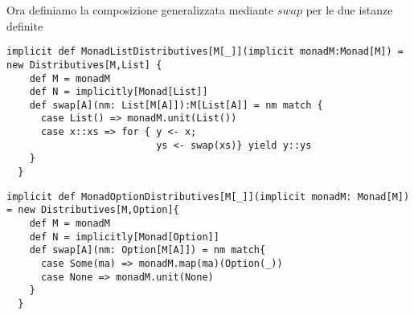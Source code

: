 Ora definiamo la composizione generalizzata mediante $swap$ per le due istanze
definite
\begin{lstlisting}[style=myScalastyle, caption=Composing List]
  implicit def MonadListDistributives[M[_]](implicit monadM:Monad[M]) = new Distributives[M,List] {
    def M = monadM
    def N = implicitly[Monad[List]]
    def swap[A](nm: List[M[A]]):M[List[A]] = nm match {
      case List() => monadM.unit(List())
      case x::xs => for { y <- x;
                          ys <- swap(xs)} yield y::ys
    }
  }
\end{lstlisting}
\begin{lstlisting}[style=myScalastyle, caption=Composing Optional]
  implicit def MonadOptionDistributives[M[_]](implicit monadM: Monad[M]) = new Distributives[M,Option]{
    def M = monadM
    def N = implicitly[Monad[Option]]
    def swap[A](nm: Option[M[A]]) = nm match{
      case Some(ma) => monadM.map(ma)(Option(_))
      case None => monadM.unit(None)
    }
  }
\end{lstlisting}